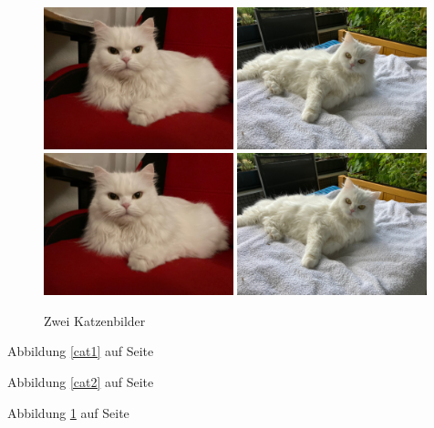 \begin{figure}
\centering
{}
{\includegraphics[width=0.49\textwidth]{Bilder/Katze}}
{\includegraphics[width=0.49\textwidth]{Bilder/Katze1}}
{\includegraphics[width=0.49\textwidth]{Bilder/Katze}}
{\includegraphics[width=0.49\textwidth]{Bilder/Katze1}}
\caption{Zwei Katzenbilder}\label{katzenbilder}
\end{figure}

Abbildung \ref{cat1} auf Seite \pageref{katzenbilder}

Abbildung \ref{cat2} auf Seite \pageref{katzenbilder}

Abbildung \ref{katzenbilder} auf Seite \pageref{katzenbilder}



\blindtext[3]

\blindtext[3]